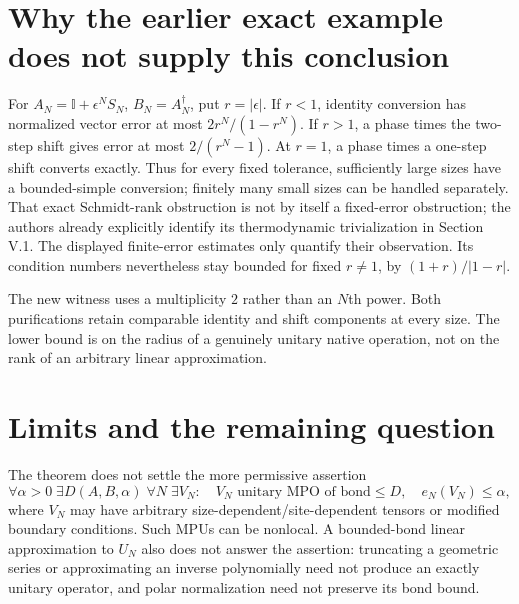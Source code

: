 \documentclass[11pt]{article}
\newcommand{\Id}{\mathbb I}
\begin{document}
\section{Why the earlier exact example does not supply this conclusion}
For $A_N=\Id+\epsilon^NS_N$, $B_N=A_N^\dagger$, put $r=|\epsilon|$. If $r<1$, identity conversion has normalized vector error at most $2r^N/(1-r^N)$. If $r>1$, a phase times the two-step shift gives error at most $2/(r^N-1)$. At $r=1$, a phase times a one-step shift converts exactly. Thus for every fixed tolerance, sufficiently large sizes have a bounded-simple conversion; finitely many small sizes can be handled separately. That exact Schmidt-rank obstruction is not by itself a fixed-error obstruction; the authors already explicitly identify its thermodynamic trivialization in Section V.1. The displayed finite-error estimates only quantify their observation. Its condition numbers nevertheless stay bounded for fixed $r\ne1$, by $(1+r)/|1-r|$.

The new witness uses a multiplicity $2$ rather than an $N$th power. Both purifications retain comparable identity and shift components at every size. The lower bound is on the radius of a genuinely unitary native operation, not on the rank of an arbitrary linear approximation.

\section{Limits and the remaining question}
The theorem does not settle the more permissive assertion
\[
 \forall\alpha>0\;\exists D(A,B,\alpha)\;\forall N\;\exists V_N:
 \quad V_N\text{ unitary MPO of bond}\le D,\quad e_N(V_N)\le\alpha,
\]
where $V_N$ may have arbitrary size-dependent/site-dependent tensors or modified boundary conditions. Such MPUs can be nonlocal. A bounded-bond linear approximation to $U_N$ also does not answer the assertion: truncating a geometric series or approximating an inverse polynomially need not produce an exactly unitary operator, and polar normalization need not preserve its bond bound.
\end{document}
